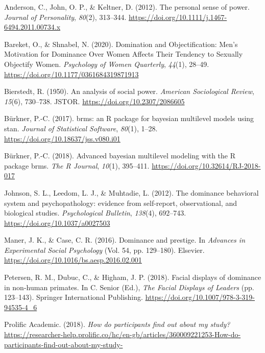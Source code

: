 \documentclass[
  english,
  ,doc, 12pt, a4paper,floatsintext]{apa7}
\newlength{\cslhangindent}
\newlength{\cslentryspacingunit} %
\newenvironment{CSLReferences}[2] %
 {%
  \setlength{\parindent}{0pt}
  \ifodd #1
  \let\oldpar\par
  \def\par{\hangindent=\cslhangindent\oldpar}
  \fi
  \setlength{\parskip}{#2\cslentryspacingunit}
 }%
 {}
\begin{document}
\hypertarget{refs}{}
\begin{CSLReferences}{1}{0}
\leavevmode{}%
Anderson, C., John, O. P., \& Keltner, D. (2012). The personal sense of power. \emph{Journal of Personality}, \emph{80}(2), 313--344. \url{https://doi.org/10.1111/j.1467-6494.2011.00734.x}

\leavevmode{}%
Bareket, O., \& Shnabel, N. (2020). Domination and Objectification: Men's Motivation for Dominance Over Women Affects Their Tendency to Sexually Objectify Women. \emph{Psychology of Women Quarterly}, \emph{44}(1), 28--49. \url{https://doi.org/10.1177/0361684319871913}

\leavevmode{}%
Bierstedt, R. (1950). An analysis of social power. \emph{American Sociological Review}, \emph{15}(6), 730--738. JSTOR. \url{https://doi.org/10.2307/2086605}

\leavevmode{}%
Bürkner, P.-C. (2017). brms: an R package for bayesian multilevel models using stan. \emph{Journal of Statistical Software}, \emph{80}(1), 1--28. \url{https://doi.org/10.18637/jss.v080.i01}

\leavevmode{}%
Bürkner, P.-C. (2018). Advanced bayesian multilevel modeling with the R package brms. \emph{The R Journal}, \emph{10}(1), 395--411. \url{https://doi.org/10.32614/RJ-2018-017}

\leavevmode{}%
Johnson, S. L., Leedom, L. J., \& Muhtadie, L. (2012). The dominance behavioral system and psychopathology: evidence from self-report, observational, and biological studies. \emph{Psychological Bulletin}, \emph{138}(4), 692--743. \url{https://doi.org/10.1037/a0027503}

\leavevmode{}%
Maner, J. K., \& Case, C. R. (2016). Dominance and prestige. In \emph{Advances in Experimental Social Psychology} (Vol. 54, pp. 129--180). Elsevier. \url{https://doi.org/10.1016/bs.aesp.2016.02.001}

\leavevmode{}%
Petersen, R. M., Dubuc, C., \& Higham, J. P. (2018). Facial displays of dominance in non-human primates. In C. Senior (Ed.), \emph{The Facial Displays of Leaders} (pp. 123--143). Springer International Publishing. \url{https://doi.org/10.1007/978-3-319-94535-4_6}

\leavevmode{}%
Prolific Academic. (2018). \emph{How do participants find out about my study?} \url{https://researcher-help.prolific.co/hc/en-gb/articles/360009221253-How-do-participants-find-out-about-my-study-}


\end{CSLReferences}
\end{document}
